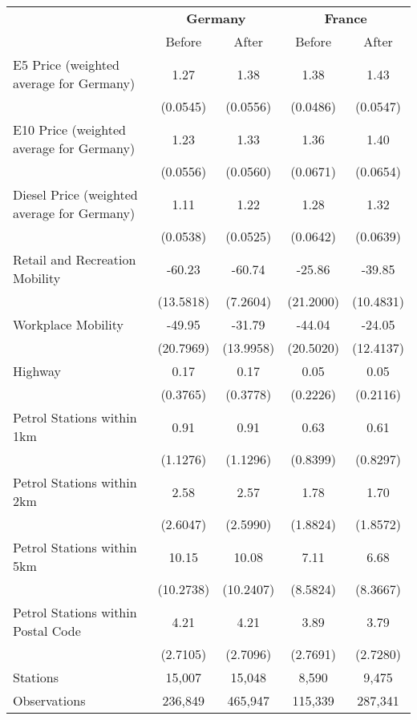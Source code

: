 \begin{tabular}{l*{4}{c}}
\toprule
                    &\multicolumn{2}{c}{\textbf{Germany}}&\multicolumn{2}{c}{\textbf{France}}\\\cmidrule(lr){2-3}\cmidrule(lr){4-5}
                    &\multicolumn{1}{c}{Before}&\multicolumn{1}{c}{After}&\multicolumn{1}{c}{Before}&\multicolumn{1}{c}{After}\\
\midrule
E5 Price (weighted average for Germany)&        1.27&        1.38&        1.38&        1.43\\
                    &    (0.0545)&    (0.0556)&    (0.0486)&    (0.0547)\\
E10 Price (weighted average for Germany)&        1.23&        1.33&        1.36&        1.40\\
                    &    (0.0556)&    (0.0560)&    (0.0671)&    (0.0654)\\
Diesel Price (weighted average for Germany)&        1.11&        1.22&        1.28&        1.32\\
                    &    (0.0538)&    (0.0525)&    (0.0642)&    (0.0639)\\
Retail and Recreation Mobility&      -60.23&      -60.74&      -25.86&      -39.85\\
                    &   (13.5818)&    (7.2604)&   (21.2000)&   (10.4831)\\
Workplace Mobility  &      -49.95&      -31.79&      -44.04&      -24.05\\
                    &   (20.7969)&   (13.9958)&   (20.5020)&   (12.4137)\\
Highway             &        0.17&        0.17&        0.05&        0.05\\
                    &    (0.3765)&    (0.3778)&    (0.2226)&    (0.2116)\\
Petrol Stations within 1km&        0.91&        0.91&        0.63&        0.61\\
                    &    (1.1276)&    (1.1296)&    (0.8399)&    (0.8297)\\
Petrol Stations within 2km&        2.58&        2.57&        1.78&        1.70\\
                    &    (2.6047)&    (2.5990)&    (1.8824)&    (1.8572)\\
Petrol Stations within 5km&       10.15&       10.08&        7.11&        6.68\\
                    &   (10.2738)&   (10.2407)&    (8.5824)&    (8.3667)\\
Petrol Stations within Postal Code&        4.21&        4.21&        3.89&        3.79\\
                    &    (2.7105)&    (2.7096)&    (2.7691)&    (2.7280)\\
\midrule
Stations            &      15,007&      15,048&       8,590&       9,475\\
Observations        &     236,849&     465,947&     115,339&     287,341\\
\bottomrule
\end{tabular}
